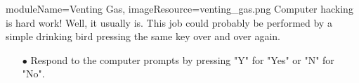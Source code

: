\documentclass{../../ktane-mod}
\begin{document}
\begin{needymodule}{
  moduleName=Venting Gas,
  imageResource=venting_gas.png
}
{
  Computer hacking is hard work!
  Well, it usually is.
  This job could probably be performed by a simple drinking bird pressing the same key over and over again.
}
  \begin{itemize}
    \item[$\bullet$] Respond to the computer prompts by pressing "Y" for "Yes" or "N" for "No".
  \end{itemize}

\end{needymodule}

\cleardoublepage
\end{document}
